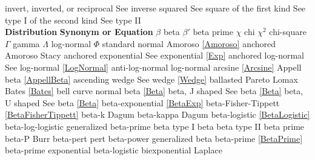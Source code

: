 \noindent
invert, inverted, or reciprocal		\dotfill	See inverse\ncite
squared						\dotfill	See square\ncite
of the first kind					\dotfill	See type I\ncite
of the second kind				\dotfill	See type II\ncite
~\\
\noindent
{\bf Distribution} \hfill {\bf Synonym or Equation}								\ncite
%
$\beta$ 						\dotfill	beta							  	\ncite	%
$\beta'$ 						\dotfill	beta prime							\ncite	%
$\chi$ 							\dotfill	chi									\ncite	%
$\chi^2$ 						\dotfill	chi-square							\ncite 	%
$\Gamma$ 						\dotfill	gamma 								\ncite 	%
$\Lambda$						\dotfill	log-normal 							   	%
$\Phi$							\dotfill	standard normal 					\ncite	%
%
Amoroso							\dotfill	\eqref{Amoroso}							%
anchored Amoroso				\dotfill	Stacy								\mcite{\self}
anchored exponential			\dotfill	See exponential \eqref{Exp}			\ncite	%
anchored log-normal				\dotfill	See log-normal \eqref{LogNormal}	\ncite
anti-log-normal 				\dotfill	log-normal 							\ncite	%
arcsine 						\dotfill	\eqref{Arcsine} 					 \ncite	%
Appell beta						\dotfill	\eqref{AppellBeta}					 
ascending wedge					\dotfill	See wedge \eqref{Wedge} 			\ncite	%
%
ballasted Pareto				\dotfill	Lomax								\ncite	%
Bates							\dotfill	\eqref{Bates}						\ncite
bell curve 						\dotfill	normal 								\ncite	%
beta 							\dotfill	\eqref{Beta} 						\ncite	%
beta, J shaped					\dotfill	See beta \eqref{Beta} 				\ncite	%
beta, U shaped					\dotfill	See beta \eqref{Beta} 				\ncite	%
beta-exponential				\dotfill	\eqref{BetaExp}						\ncite	%
beta-Fisher-Tippett				\dotfill	\eqref{BetaFisherTippett}			\ncite	
beta-k							\dotfill	Dagum									%
beta-kappa 						\dotfill	Dagum  									%
beta-logistic					\dotfill	\eqref{BetaLogistic}				\mcite{\self}	%
beta-log-logistic				\dotfill	generalized beta-prime				\mcite{\self}	%
beta type I 					\dotfill	beta 								\ncite	%
beta type II 					\dotfill	beta prime							\ncite	%
beta-P 							\dotfill	Burr 				 					%
beta-pert						\dotfill	pert 								\ncite	%
beta-power						\dotfill	generalized beta					\ncite	%
beta-prime 						\dotfill	\eqref{BetaPrime} 					\ncite	%
beta-prime exponential			\dotfill	beta-logistic						\mcite{\self} %
biexponential					\dotfill	Laplace								\ncite	%
